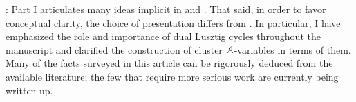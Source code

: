 : Part I articulates many ideas implicit in \cite{CasalsZaslow,CasalsWeng22} and \cite{CGGLSS25}. That said, in order to favor conceptual clarity, the choice of presentation differs from \cite{CGGLSS25}. In particular, I have emphasized the role and importance of dual Lusztig cycles throughout the manuscript and clarified the construction of cluster $\mathcal{A}$-variables in terms of them. Many of the facts surveyed in this article can be rigorously deduced from the available literature; the few that require more serious work are currently being written up.\sbs

